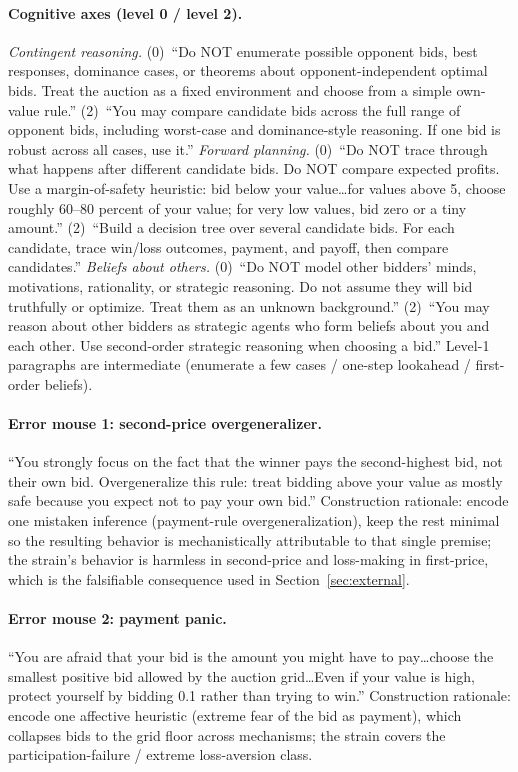 \documentclass[12pt]{article}
\begin{document}
\paragraph{Cognitive axes (level 0 / level 2).}
\emph{Contingent reasoning.} (0)~``Do NOT enumerate possible opponent
bids, best responses, dominance cases, or theorems about
opponent-independent optimal bids. Treat the auction as a fixed
environment and choose from a simple own-value rule.'' (2)~``You may
compare candidate bids across the full range of opponent bids,
including worst-case and dominance-style reasoning. If one bid is
robust across all cases, use it.''
\emph{Forward planning.} (0)~``Do NOT trace through what happens
after different candidate bids. Do NOT compare expected profits. Use
a margin-of-safety heuristic: bid below your value\dots for values
above 5, choose roughly 60--80 percent of your value; for very low
values, bid zero or a tiny amount.'' (2)~``Build a decision tree over
several candidate bids. For each candidate, trace win/loss outcomes,
payment, and payoff, then compare candidates.''
\emph{Beliefs about others.} (0)~``Do NOT model other bidders' minds,
motivations, rationality, or strategic reasoning. Do not assume they
will bid truthfully or optimize. Treat them as an unknown
background.'' (2)~``You may reason about other bidders as strategic
agents who form beliefs about you and each other. Use second-order
strategic reasoning when choosing a bid.''
Level-1 paragraphs are intermediate (enumerate a few cases / one-step
lookahead / first-order beliefs).

\paragraph{Error mouse 1: second-price overgeneralizer.} ``You
strongly focus on the fact that the winner pays the second-highest
bid, not their own bid. Overgeneralize this rule: treat bidding above
your value as mostly safe because you expect not to pay your own
bid.'' Construction rationale: encode one mistaken inference
(payment-rule overgeneralization), keep the rest minimal so the
resulting behavior is mechanistically attributable to that single
premise; the strain's behavior is harmless in second-price and
loss-making in first-price, which is the falsifiable consequence used
in Section~\ref{sec:external}.

\paragraph{Error mouse 2: payment panic.} ``You are afraid that your
bid is the amount you might have to pay\dots choose the smallest
positive bid allowed by the auction grid\dots Even if your value is
high, protect yourself by bidding 0.1 rather than trying to win.''
Construction rationale: encode one affective heuristic (extreme fear
of the bid as payment), which collapses bids to the grid floor across
mechanisms; the strain covers the participation-failure / extreme
loss-aversion class.
\end{document}
